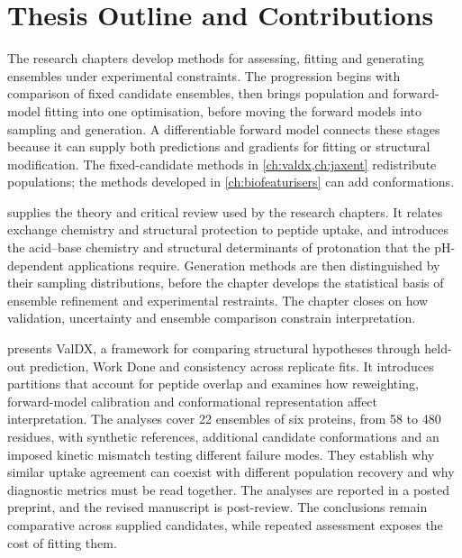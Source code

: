 \section{Thesis Outline and Contributions}
\label{sec:intro-outline}

The research chapters develop methods for assessing, fitting and generating ensembles under experimental constraints. The progression begins with comparison of fixed candidate ensembles, then brings population and forward-model fitting into one optimisation, before moving the forward models into sampling and generation. A differentiable forward model connects these stages because it can supply both predictions and gradients for fitting or structural modification. The fixed-candidate methods in \cref{ch:valdx,ch:jaxent} redistribute populations; the methods developed in \cref{ch:biofeaturisers} can add conformations.

 supplies the theory and critical review used by the research chapters. It relates exchange chemistry and structural protection to peptide uptake, and introduces the acid--base chemistry and structural determinants of protonation that the pH-dependent applications require. Generation methods are then distinguished by their sampling distributions, before the chapter develops the statistical basis of ensemble refinement and experimental restraints. The chapter closes on how validation, uncertainty and ensemble comparison constrain interpretation.

 presents ValDX, a framework for comparing structural hypotheses through held-out prediction, Work Done and consistency across replicate fits. It introduces partitions that account for peptide overlap and examines how reweighting, forward-model calibration and conformational representation affect interpretation. The analyses cover 22 ensembles of six proteins, from 58 to 480 residues, with synthetic references, additional candidate conformations and an imposed kinetic mismatch testing different failure modes. They establish why similar uptake agreement can coexist with different population recovery and why diagnostic metrics must be read together. The analyses are reported in a posted preprint,\supercite{siddiquiFrameworkTestingStructural2026} and the revised manuscript is post-review. The conclusions remain comparative across supplied candidates, while repeated assessment exposes the cost of fitting them.

